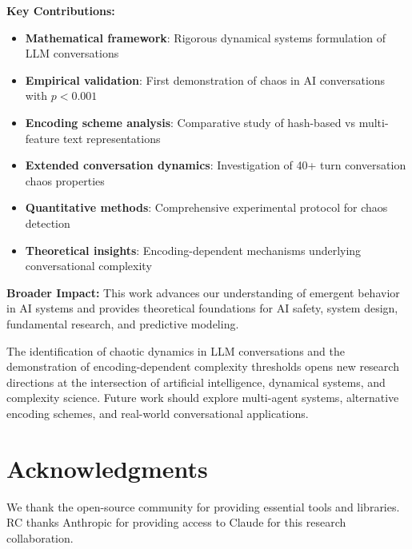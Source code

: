 \documentclass[11pt,a4paper]{article}
\begin{document}
\textbf{Key Contributions:}
\begin{itemize}
    \item \textbf{Mathematical framework}: Rigorous dynamical systems formulation of LLM conversations
    \item \textbf{Empirical validation}: First demonstration of chaos in AI conversations with $p < 0.001$
    \item \textbf{Encoding scheme analysis}: Comparative study of hash-based vs multi-feature text representations
    \item \textbf{Extended conversation dynamics}: Investigation of 40+ turn conversation chaos properties
    \item \textbf{Quantitative methods}: Comprehensive experimental protocol for chaos detection
    \item \textbf{Theoretical insights}: Encoding-dependent mechanisms underlying conversational complexity
\end{itemize}

\textbf{Broader Impact:}
This work advances our understanding of emergent behavior in AI systems and provides theoretical foundations for AI safety, system design, fundamental research, and predictive modeling.

The identification of chaotic dynamics in LLM conversations and the demonstration of encoding-dependent complexity thresholds opens new research directions at the intersection of artificial intelligence, dynamical systems, and complexity science. Future work should explore multi-agent systems, alternative encoding schemes, and real-world conversational applications.

\section*{Acknowledgments}

We thank the open-source community for providing essential tools and libraries. RC thanks Anthropic for providing access to Claude for this research collaboration.
\end{document}
